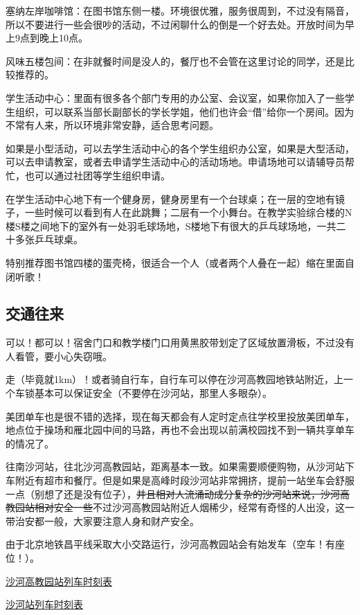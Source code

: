 塞纳左岸咖啡馆：在图书馆东侧一楼。环境很优雅，服务很周到，不过没有隔音，所以不要进行一些会很吵的活动，不过闲聊什么的倒是一个好去处。开放时间为早上9点到晚上10点。

风味五楼包间：在非就餐时间是没人的，餐厅也不会管在这里讨论的同学，还是比较推荐的。

学生活动中心：里面有很多各个部门专用的办公室、会议室，如果你加入了一些学生组织，可以联系当部长副部长的学长学姐，他们也许会“借”给你一个房间。因为不常有人来，所以环境非常安静，适合思考问题。


如果是小型活动，可以去学生活动中心的各个学生组织办公室，如果是大型活动，可以去申请教室，或者去申请学生活动中心的活动场地。申请场地可以请辅导员帮忙，也可以通过社团等学生组织申请。

在学生活动中心地下有一个健身房，健身房里有一个台球桌；在一层的空地有镜子，一些时候可以看到有人在此跳舞；二层有一个小舞台。在教学实验综合楼的N楼S楼之间地下的室外有一处羽毛球场地，S楼地下有很大的乒乓球场地，一共二十多张乒乓球桌。


特别推荐图书馆四楼的蛋壳椅，很适合一个人（或者两个人叠在一起）缩在里面自闭听歌！

\subsection{交通往来}


可以！都可以！宿舍门口和教学楼门口用黄黑胶带划定了区域放置滑板，不过没有人看管，要小心失窃哦。


走（毕竟就1km）！或者骑自行车，自行车可以停在沙河高教园地铁站附近，上一个车锁基本可以保证安全（不要停在沙河站，那里人多眼杂）。

美团单车也是很不错的选择，现在每天都会有人定时定点往学校里投放美团单车，地点位于操场和雁北园中间的马路，再也不会出现以前满校园找不到一辆共享单车的情况了。


往南沙河站，往北沙河高教园站，距离基本一致。如果需要顺便购物，从沙河站下车附近有超市和餐厅。但是如果是高峰时段沙河站非常拥挤，提前一站坐车会舒服一点（别想了还是没有位子），\sout{并且相对人流涌动成分复杂的沙河站来说，沙河高教园站相对安全一些}不过沙河高教园站附近人烟稀少，经常有奇怪的人出没，这一带治安都一般，大家要注意人身和财产安全。

由于北京地铁昌平线采取大小交路运行，沙河高教园站会有始发车（空车！有座位！）。

\href{https://www.bjsubway.com/station/xltcx/linecp/2013-08-26/246.html?sk=1}{沙河高教园站列车时刻表}

\href{https://www.bjsubway.com/station/xltcx/linecp/2013-08-26/249.html?sk=1}{沙河站列车时刻表}
